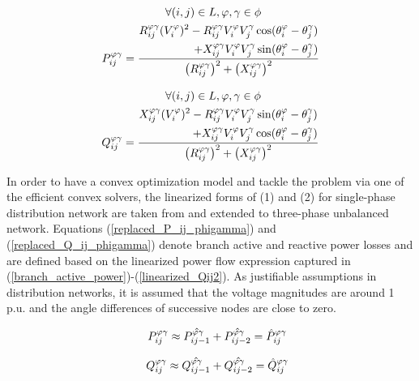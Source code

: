 \documentclass[journal]{IEEEtran}
\begin{document}
\begin{equation}\label{4}
P_{ij}^{\varphi\gamma}=
\frac
{
\begin{split}
\forall (i,j) \in L, \varphi,\gamma \in \phi \hskip 50pt\\
R_{ij}^{\varphi\gamma}(V_{i}^{\varphi})^2 -R_{ij}^{\varphi\gamma}V_{i}^{\varphi}V_{j}^{\gamma} \cos(\theta_{i}^{\varphi}-\theta_{j}^{\gamma})\\+ X_{ij}^{\varphi\gamma}V_{i}^{\varphi}V_{j}^{\gamma}\sin(\theta_{i}^{\varphi}-\theta_{j}^{\gamma})
\end{split}}
{\left(R_{ij}^{\varphi\gamma}\right)^2 + \left(X_{ij}^{\varphi\gamma}\right)^2}
\end{equation}

\begin{equation}\label{5}
Q_{ij}^{\varphi\gamma}= \frac
{
\begin{split}
\forall (i,j) \in L, \varphi,\gamma \in \phi \hskip 50pt\\
X_{ij}^{\varphi\gamma}(V_{i}^{\varphi})^2 -R_{ij}^{\varphi\gamma}V_{i}^{\varphi}V_{j}^{\gamma} \sin(\theta_{i}^{\varphi}-\theta_{j}^{\gamma})\\ +X_{ij}^{\varphi\gamma}V_{i}^{\varphi}V_{j}^{\gamma}\cos(\theta_{i}^{\varphi}-\theta_{j}^{\gamma})
\end{split}
}
{\left(R_{ij}^{\varphi\gamma}\right)^2 + \left(X_{ij}^{\varphi\gamma}\right)^2}
\end{equation}

In order to have a convex optimization model and tackle the problem via one of the efficient convex solvers, the linearized forms of (1) and (2) for single-phase distribution network are taken from \cite{yuan2016novel} and extended to three-phase unbalanced network. Equations (\ref{replaced_P_ij_phigamma}) and (\ref{replaced_Q_ij_phigamma}) denote branch active and reactive power losses and are defined based on the linearized power flow expression captured in (\ref{branch_active_power})-(\ref{linearized_Qij2}). As justifiable assumptions in distribution networks, it is assumed that the voltage magnitudes are around 1 p.u. and the angle differences of successive nodes are close to zero.

\begin{equation}\label{branch_active_power} \hskip 1pc
P_{ij}^{\varphi\gamma} \approx \hat{P_{ij-1}^{\varphi\gamma}} + \hat{P_{ij-2}^{\varphi\gamma}} = \hat{P}_{ij}^{\varphi\gamma}
\end{equation}

\begin{equation}\label{branch_reactive_power}
\hskip 1pc
Q_{ij}^{\varphi\gamma} \approx \hat{Q_{ij-1}^{\varphi\gamma}} + \hat{Q_{ij-2}^{\varphi\gamma}} = \hat{Q}_{ij}^{\varphi\gamma}
\end{equation}
\end{document}
